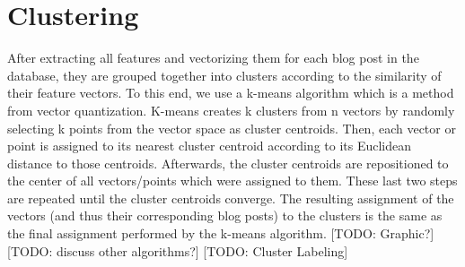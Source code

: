 \section{Clustering}
\label{sec:clustering}

After extracting all features and vectorizing them for each blog post in the database, they are grouped together into clusters according to the similarity of their feature vectors. To this end, we use a k-means algorithm which is a method from vector quantization.
K-means creates k clusters from n vectors by randomly selecting k points from the vector space as cluster centroids. Then, each vector or point is assigned to its nearest cluster centroid according to its Euclidean distance to those centroids. Afterwards, the cluster centroids are repositioned to the center of all vectors/points which were assigned to them. These last two steps are repeated until the cluster centroids converge. The resulting assignment of the vectors (and thus their corresponding blog posts) to the clusters is the same as the final assignment performed by the k-means algorithm. [TODO: Graphic?]
[TODO: discuss other algorithms?]
[TODO: Cluster Labeling]
